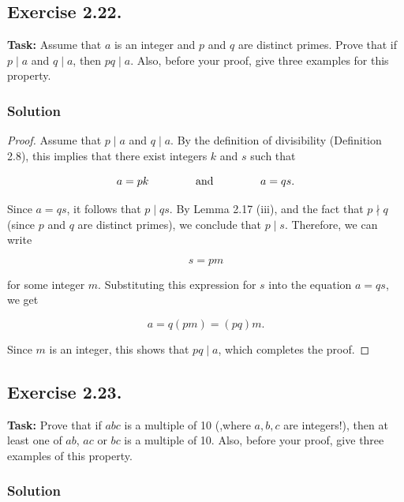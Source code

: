 \documentclass{article}
\begin{document}
\newpage

\subsection{Exercise 2.22.}
\textbf{Task:} Assume that $a$ is an integer and $p$ and $q$ are distinct primes. Prove that if $p \mid a$ and $q \mid a$, then $pq \mid a$. Also, before your proof, give three examples for this property.

\subsubsection*{Solution}

\begin{proof}
    Assume that $p \mid a$ and $q \mid a$. By the definition of divisibility (Definition 2.8), this implies that there exist integers $k$ and $s$ such that

    \[
        a = pk \hspace{1.5cm} \text{and} \hspace{1.5cm} a = qs.
    \]

    Since $a = qs$, it follows that $p \mid qs$. By Lemma 2.17 (iii), and the fact that $p \nmid q$ (since $p$ and $q$ are distinct primes), we conclude that $p \mid s$. Therefore, we can write

    \[
        s = pm
    \]

    for some integer $m$. Substituting this expression for $s$ into the equation $a = qs$, we get

    \[
        a = q(pm) = (pq)m.
    \]

    Since $m$ is an integer, this shows that $pq \mid a$, which completes the proof.
\end{proof}

\newpage

\subsection{Exercise 2.23.}
\textbf{Task:} Prove that if $abc$ is a multiple of 10 (,where $a,b,c$ are integers!), then at least one of $ab$, $ac$ or $bc$ is a multiple of 10. Also, before your proof, give three examples of this property.

\subsubsection*{Solution}
\end{document}
